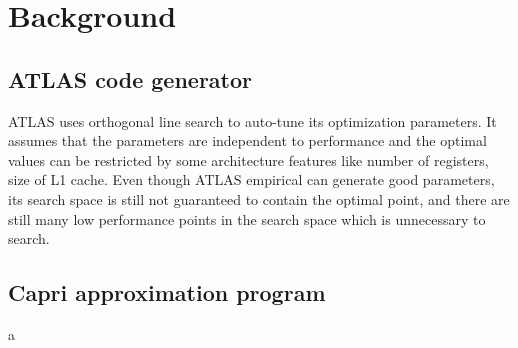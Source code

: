 \section{Background}
\label{sec:background}

  \subsection{ATLAS code generator}
  \label{sec:atlas_intro}
  ATLAS uses orthogonal line search to auto-tune its optimization parameters.
  It assumes that the parameters are independent to performance and the optimal values can be
  restricted by some architecture features like number of registers, size of L1 cache.
  Even though ATLAS empirical can generate good parameters, its search space is still not guaranteed to contain
  the optimal point, and there are still many low performance points in the search space which is unnecessary
  to search.

  \subsection{Capri approximation program}
  \label{sec:Capri_intro}
  a
